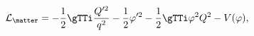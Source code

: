 \begin{equation}
\mathcal{L}_\matter = -\frac{1}{2} \gTTi \frac{Q'^2}{q^2} -
\frac{1}{2} \varphi'^2 - \frac{1}{2} \gTTi \varphi^2 Q^2 - V(\varphi),
\end{equation}

